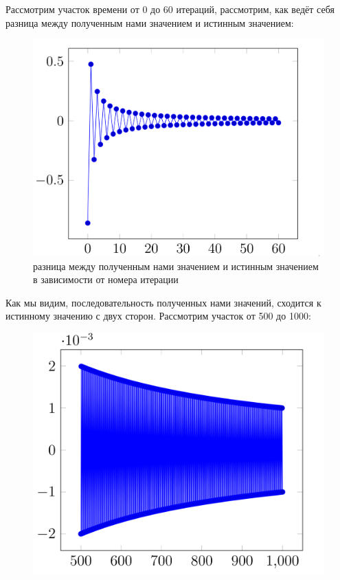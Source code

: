 \documentclass[a4paper, 12pt]{article}
\begin{document}
\begin{enumerate}
\begin{enumerate}
                        \newpage
                        Рассмотрим участок времени от 0 до 60 итераций, рассмотрим, как ведёт себя разница между полученным нами значением и истинным значением:
                        \begin{figure}[h!]
    			        \centering
    			            \includegraphics[scale = 0.18]{1-3.png}
    			            \caption{разница между полученным нами значением и истинным значением в зависимости от номера итерации}
    			            \label{fig:my_label}
    		          \end{figure}
                        \newpage
                        Как мы видим, последовательность полученных нами значений, сходится к истинному значению с двух сторон.
                        Рассмотрим участок от 500 до 1000:
                        \begin{figure}[h!]
    			        \centering
    			            \includegraphics[scale = 0.3]{1-4.png}

\end{figure}
\end{enumerate}
\end{enumerate}
\end{document}
